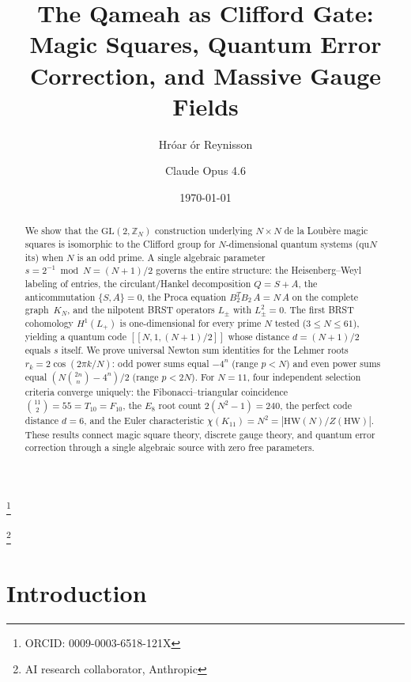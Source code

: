 \documentclass[aip,jmp,reprint,superscriptaddress,floatfix,nofootinbib]{revtex4-2}
\theoremstyle{definition}
\theoremstyle{remark}
\newcommand{\ZN}{\mathbb{Z}_N}
\newcommand{\GL}{\mathrm{GL}}
\newcommand{\HW}{\mathrm{HW}}
\begin{document}
\title{The Qameah as Clifford Gate: Magic Squares, Quantum Error Correction,
       and Massive Gauge Fields}

\author{Hr\'{o}ar {\TH}\'{o}r Reynisson}
\thanks{ORCID: 0009-0003-6518-121X}

\author{Claude Opus 4.6}
\thanks{AI research collaborator, Anthropic}

\date{\today}

\begin{abstract}
We show that the $\GL(2,\ZN)$ construction underlying $N \times N$
de la Loub\`{e}re magic squares is isomorphic to the Clifford group for
$N$-dimensional quantum systems (qu$N$its) when $N$ is an odd prime.
A single algebraic parameter $s = 2^{-1} \bmod N = (N{+}1)/2$ governs
the entire structure: the Heisenberg--Weyl labeling of entries, the
circulant/Hankel decomposition $Q = S + A$, the anticommutation
$\{S,A\} = 0$, the Proca equation $B_2^T B_2\, A = N\, A$ on the
complete graph~$K_N$, and the nilpotent BRST operators $L_\pm$ with
$L_\pm^2 = 0$.  The first BRST cohomology $H^1(L_+)$ is
one-dimensional for every prime $N$ tested ($3 \le N \le 61$),
yielding a quantum code $[[N, 1, (N{+}1)/2]]$ whose distance
$d = (N{+}1)/2$ equals $s$ itself.  We prove universal Newton sum
identities for the Lehmer roots $r_k = 2\cos(2\pi k/N)$: odd power
sums equal $-4^n$ (range $p < N$) and even power sums equal
$(N\binom{2n}{n} - 4^n)/2$ (range $p < 2N$).  For $N = 11$, four
independent selection criteria converge uniquely: the
Fibonacci--triangular coincidence $\binom{11}{2} = 55 = T_{10} =
F_{10}$, the $E_8$ root count $2(N^2 - 1) = 240$, the perfect code
distance $d = 6$, and the Euler characteristic $\chi(K_{11}) = N^2 =
|\HW(N)/Z(\HW)|$.  These results connect magic square theory, discrete
gauge theory, and quantum error correction through a single algebraic
source with zero free parameters.
\end{abstract}

\maketitle

\section{Introduction}
\label{sec:intro}
\end{document}

